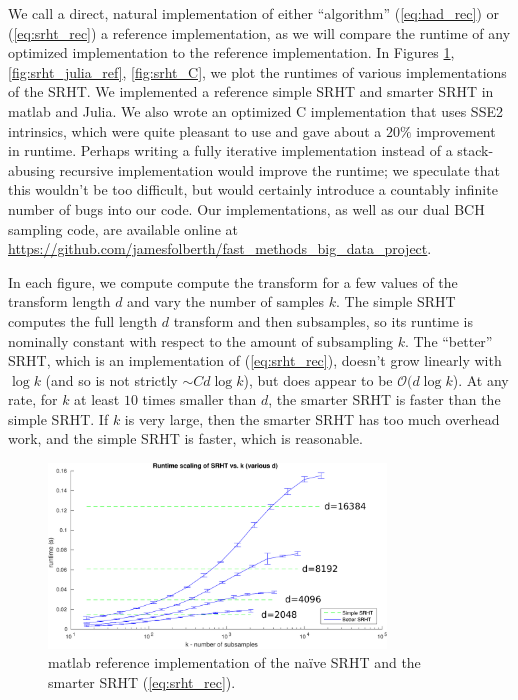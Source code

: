 \documentclass[12pt]{article}
\begin{document}
We call a direct, natural implementation of either ``algorithm'' (\ref{eq:had_rec}) or (\ref{eq:srht_rec}) a reference implementation, as we will compare the runtime of any optimized implementation to the reference implementation.  In Figures \ref{fig:srht_matlab_ref}, \ref{fig:srht_julia_ref}, \ref{fig:srht_C}, we plot the runtimes of various implementations of the SRHT.  We implemented a reference simple SRHT and smarter SRHT in {\sc matlab} and Julia.  We also wrote an optimized C implementation that uses SSE2 intrinsics, which were quite pleasant to use and gave about a $20\%$ improvement in runtime.  Perhaps writing a fully iterative implementation instead of a stack-abusing recursive implementation would improve the runtime; we speculate that this wouldn't be too difficult, but would certainly introduce a countably infinite number of bugs into our code.  Our implementations, as well as our dual BCH sampling code,  are available online at \url{https://github.com/jamesfolberth/fast_methods_big_data_project}.

In each figure, we compute compute the transform for a few values of the transform length $d$ and vary the number of samples $k$.  The simple SRHT computes the full length $d$ transform and then subsamples, so its runtime is nominally constant with respect to the amount of subsampling $k$.  The ``better'' SRHT, which is an implementation of (\ref{eq:srht_rec}), doesn't grow linearly with $\log k$ (and so is not strictly $\sim C d\log k$), but does appear to be $\mathcal{O}(d\log k$).  At any rate, for $k$ at least $10$ times smaller than $d$, the smarter SRHT is faster than the simple SRHT.  If $k$ is very large, then the smarter SRHT has too much overhead work, and the simple SRHT is faster, which is reasonable.


\begin{figure}[ht!]
   \centering
   \includegraphics[width=0.8\textwidth]{figures/srht_matlab_ref_k_scaling_trim.pdf}
   \caption{{\sc matlab} reference implementation of the na\"ive SRHT and the smarter SRHT (\ref{eq:srht_rec}).}
   \label{fig:srht_matlab_ref}
\end{figure}
\end{document}

